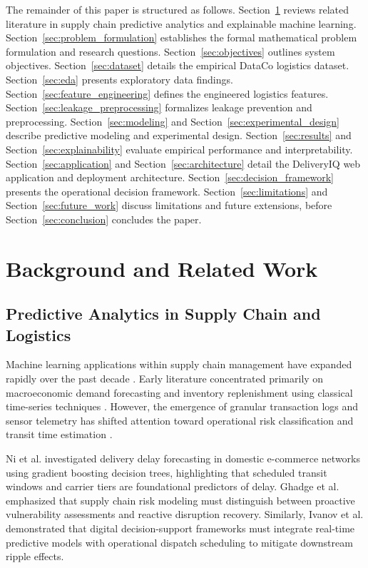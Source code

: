 \documentclass[journal,10pt,twocolumn]{IEEEtran}
\begin{document}
The remainder of this paper is structured as follows. Section~\ref{sec:related_work} reviews related literature in supply chain predictive analytics and explainable machine learning. Section~\ref{sec:problem_formulation} establishes the formal mathematical problem formulation and research questions. Section~\ref{sec:objectives} outlines system objectives. Section~\ref{sec:dataset} details the empirical DataCo logistics dataset. Section~\ref{sec:eda} presents exploratory data findings. Section~\ref{sec:feature_engineering} defines the engineered logistics features. Section~\ref{sec:leakage_preprocessing} formalizes leakage prevention and preprocessing. Section~\ref{sec:modeling} and Section~\ref{sec:experimental_design} describe predictive modeling and experimental design. Section~\ref{sec:results} and Section~\ref{sec:explainability} evaluate empirical performance and interpretability. Section~\ref{sec:application} and Section~\ref{sec:architecture} detail the DeliveryIQ web application and deployment architecture. Section~\ref{sec:decision_framework} presents the operational decision framework. Section~\ref{sec:limitations} and Section~\ref{sec:future_work} discuss limitations and future extensions, before Section~\ref{sec:conclusion} concludes the paper.

\section{Background and Related Work}
\label{sec:related_work}

\subsection{Predictive Analytics in Supply Chain and Logistics}
Machine learning applications within supply chain management have expanded rapidly over the past decade \cite{pournader2021applications}. Early literature concentrated primarily on macroeconomic demand forecasting and inventory replenishment using classical time-series techniques \cite{carbonneau2008application}. However, the emergence of granular transaction logs and sensor telemetry has shifted attention toward operational risk classification and transit time estimation \cite{baryannis2019supply}.

Ni et al. \cite{ni2020forecasting} investigated delivery delay forecasting in domestic e-commerce networks using gradient boosting decision trees, highlighting that scheduled transit windows and carrier tiers are foundational predictors of delay. Ghadge et al. \cite{ghadge2012supply} emphasized that supply chain risk modeling must distinguish between proactive vulnerability assessments and reactive disruption recovery. Similarly, Ivanov et al. \cite{ivanov2019digital} demonstrated that digital decision-support frameworks must integrate real-time predictive models with operational dispatch scheduling to mitigate downstream ripple effects.
\end{document}
